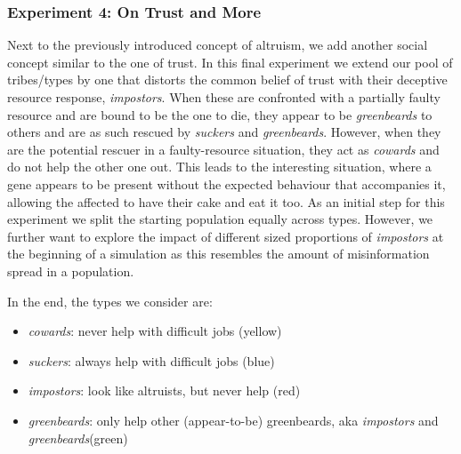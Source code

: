 \documentclass[sigconf]{acmart}
\newcommand{\cowards}{\textit{cowards}\xspace}
\newcommand{\suckers}{\textit{suckers}\xspace}
\newcommand{\impostors}{\textit{impostors}\xspace}
\newcommand{\greenbeards}{\textit{greenbeards}\xspace}
\begin{document}
    \subsubsection*{Experiment 4: On Trust and More}
    Next to the previously introduced concept of altruism, we add another social concept similar to the one of trust.
    In this final experiment we extend our pool of tribes/types by one that distorts the common belief of trust with their deceptive resource response, \impostors.
    When these are confronted with a partially faulty resource and are bound to be the one to die, they appear to be \greenbeards to others and are as such rescued by \suckers and \greenbeards.
    However, when they are the potential rescuer in a faulty-resource situation, they act as \cowards and do not help the other one out.
    This leads to the interesting situation, where a gene appears to be present without the expected behaviour that accompanies it, allowing the affected to have their cake and eat it too.
    As an initial step for this experiment we split the starting population equally across types.
    However, we further want to explore the impact of different sized proportions of \impostors at the beginning of a simulation as this resembles the amount of misinformation spread in a population.


    In the end, the types we consider are:
    \begin{itemize}
        \item \cowards: never help with difficult jobs (yellow)
        \item \suckers: always help with difficult jobs (blue)
        \item \impostors: look like altruists, but never help (red)
        \item \greenbeards: only help other (appear-to-be) greenbeards, aka \impostors and \greenbeards (green)
    \end{itemize}


\end{document}
